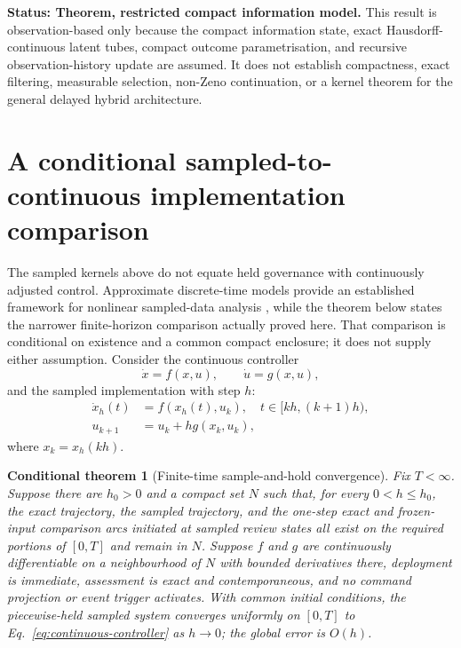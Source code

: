 \documentclass[11pt]{article}
\newtheorem{conditionaltheorem}{Conditional theorem}
\theoremstyle{definition}
\newcommand{\status}[1]{\par\smallskip\noindent\textbf{Status: #1.}\quad}
\begin{document}
\status{Theorem, restricted compact information model} This result is observation-based only because the compact information state, exact Hausdorff-continuous latent tubes, compact outcome parametrisation, and recursive observation-history update are assumed. It does not establish compactness, exact filtering, measurable selection, non-Zeno continuation, or a kernel theorem for the general delayed hybrid architecture.

\section{A conditional sampled-to-continuous implementation comparison}

The sampled kernels above do not equate held governance with continuously adjusted control. Approximate discrete-time models provide an established framework for nonlinear sampled-data analysis \cite{nesic2004}, while the theorem below states the narrower finite-horizon comparison actually proved here. That comparison is conditional on existence and a common compact enclosure; it does not supply either assumption. Consider the continuous controller
\begin{equation}
\dot x=f(x,u),\qquad \dot u=g(x,u),
\label{eq:continuous-controller}
\end{equation}
and the sampled implementation with step $h$:
\begin{align}
\dot x_h(t)&=f(x_h(t),u_k),\quad t\in[kh,(k+1)h),\\
u_{k+1}&=u_k+h g(x_k,u_k),
\label{eq:sampled-controller}
\end{align}
where $x_k=x_h(kh)$.

\begin{conditionaltheorem}[Finite-time sample-and-hold convergence]
\label{thm:sampled-limit}
Fix $T<\infty$. Suppose there are $h_0>0$ and a compact set $N$ such that, for every $0<h\le h_0$, the exact trajectory, the sampled trajectory, and the one-step exact and frozen-input comparison arcs initiated at sampled review states all exist on the required portions of $[0,T]$ and remain in $N$. Suppose $f$ and $g$ are continuously differentiable on a neighbourhood of $N$ with bounded derivatives there, deployment is immediate, assessment is exact and contemporaneous, and no command projection or event trigger activates. With common initial conditions, the piecewise-held sampled system converges uniformly on $[0,T]$ to Eq.~\eqref{eq:continuous-controller} as $h\to0$; the global error is $O(h)$.
\end{conditionaltheorem}
\end{document}
